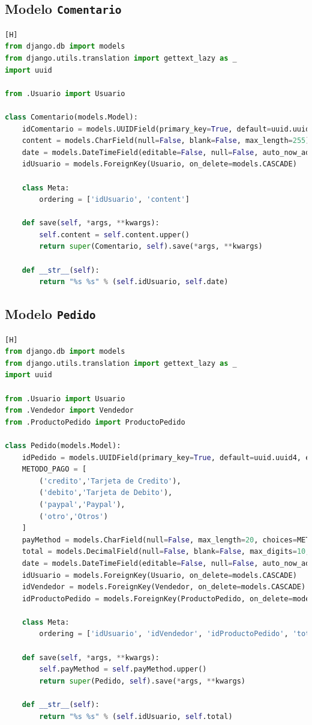 \documentclass{article}
\begin{document}
\subsection*{Modelo \texttt{Comentario}}
		  \begin{lstlisting}[language=Python,caption={Comentario.py}][H]
from django.db import models
from django.utils.translation import gettext_lazy as _
import uuid

from .Usuario import Usuario

class Comentario(models.Model):
    idComentario = models.UUIDField(primary_key=True, default=uuid.uuid4, editable=False)
    content = models.CharField(null=False, blank=False, max_length=255)
    date = models.DateTimeField(editable=False, null=False, auto_now_add=True)
    idUsuario = models.ForeignKey(Usuario, on_delete=models.CASCADE)

    class Meta:
        ordering = ['idUsuario', 'content']

    def save(self, *args, **kwargs):
        self.content = self.content.upper()
        return super(Comentario, self).save(*args, **kwargs)

    def __str__(self):
        return "%s %s" % (self.idUsuario, self.date)
    \end{lstlisting}


\subsection*{Modelo \texttt{Pedido}}
		  \begin{lstlisting}[language=Python,caption={Pedido.py}][H]
from django.db import models
from django.utils.translation import gettext_lazy as _
import uuid

from .Usuario import Usuario
from .Vendedor import Vendedor
from .ProductoPedido import ProductoPedido

class Pedido(models.Model):
    idPedido = models.UUIDField(primary_key=True, default=uuid.uuid4, editable=False)
    METODO_PAGO = [
        ('credito','Tarjeta de Credito'),
        ('debito','Tarjeta de Debito'),
        ('paypal','Paypal'),
        ('otro','Otros')
    ]
    payMethod = models.CharField(null=False, max_length=20, choices=METODO_PAGO, default='credito')
    total = models.DecimalField(null=False, blank=False, max_digits=10, decimal_places=2, default=0.00)
    date = models.DateTimeField(editable=False, null=False, auto_now_add=True)
    idUsuario = models.ForeignKey(Usuario, on_delete=models.CASCADE)
    idVendedor = models.ForeignKey(Vendedor, on_delete=models.CASCADE)
    idProductoPedido = models.ForeignKey(ProductoPedido, on_delete=models.CASCADE)

    class Meta:
        ordering = ['idUsuario', 'idVendedor', 'idProductoPedido', 'total', 'date']

    def save(self, *args, **kwargs):
        self.payMethod = self.payMethod.upper()
        return super(Pedido, self).save(*args, **kwargs)

    def __str__(self):
        return "%s %s" % (self.idUsuario, self.total)
    \end{lstlisting}
\end{document}
